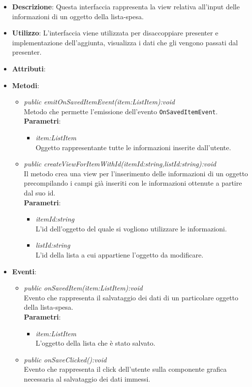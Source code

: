 \begin{itemize}
\item \textbf{Descrizione}: Questa interfaccia rappresenta la view relativa all'input delle informazioni di un oggetto della lista-spesa.
\item \textbf{Utilizzo}: L'interfaccia viene utilizzata per disaccoppiare presenter e implementazione dell'aggiunta, visualizza i dati che gli vengono passati dal presenter.
\item \textbf{Attributi}:
\item \textbf{Metodi}:
	\begin{itemize}
	\item \textit{public emitOnSavedItemEvent(item:ListItem):void}\\
	Metodo che permette l'emissione dell'evento \texttt{OnSavedItemEvent}.
			\\ \textbf{Parametri}: \begin{itemize}
			\item \textit{item:ListItem}\\
			Oggetto rappresentante tutte le informazioni inserite dall'utente.
			\end{itemize} 
	\item \textit{public createViewForItemWithId(itemId:string,listId:string):void}\\
	Il metodo crea una view per l'inserimento delle informazioni di un oggetto precompilando i campi già inseriti con le informazioni ottenute a partire dal suo id.
			\\ \textbf{Parametri}: \begin{itemize}
			\item \textit{itemId:string}\\
			L'id dell'oggetto del quale si vogliono utilizzare le informazioni.
			\item \textit{listId:string}\\
			L'id della lista a cui appartiene l'oggetto da modificare.
			\end{itemize} 
	\end{itemize}
\item \textbf{Eventi}:
\begin{itemize}
\item \textit{public onSavedItem(item:ListItem):void}\\
Evento che rappresenta il salvataggio dei dati di un particolare oggetto della lista-spesa.
			\\ \textbf{Parametri}: \begin{itemize}
			\item \textit{item:ListItem}\\
			L'oggetto della lista che è stato salvato.
			\end{itemize} 
\item \textit{public onSaveClicked():void}\\
Evento che rappresenta il click dell'utente sulla componente grafica necessaria al salvataggio dei dati immessi.
\end{itemize}
\end{itemize}

